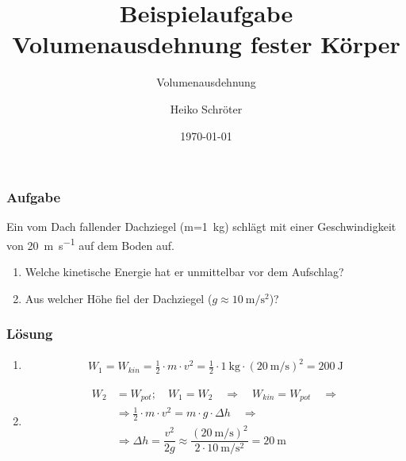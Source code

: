 \documentclass{beamer}
\title{Beispielaufgabe Volumenausdehnung fester Körper}
\subtitle{Volumenausdehnung}
\author{Heiko Schröter}
\date{\today}
\begin{document}

\frame
{
  \frametitle{Aufgabe}
Ein vom Dach fallender Dachziegel (m=\SI{1}{\kilo\gram}) schlägt mit einer Geschwindigkeit von \SI{20}{\meter\per\second} auf dem Boden auf.\\
\begin{enumerate}
\item Welche kinetische Energie hat er unmittelbar vor dem Aufschlag?
\item Aus welcher Höhe fiel der Dachziegel ($g\approx\SI{10}{\meter\per\square\second}$)?
\end{enumerate}
}
\frame
{
\frametitle{Lösung}
\begin{enumerate}
\item 
\begin{align*}
W_1=W_{kin}=\frac{1}{2}\cdot m\cdot v^{2}=\frac{1}{2}\cdot \SI{1}{\kilo\gram}\cdot \left( \SI{20}{\meter\per\second}\right)^{2}=\SI{200}{\joule}
\end{align*}
\item
\begin{align*}
W_2&=W_{pot};\quad W_1=W_2\quad\Rightarrow\quad W_{kin}=W_{pot}\quad\Rightarrow\\
&\Rightarrow \frac{1}{2}\cdot m\cdot v^{2}=m\cdot g\cdot \Delta h\quad \Rightarrow\\
&\Rightarrow \Delta h=\dfrac{v^{2}}{2g}\approx \dfrac{\left( \SI{20}{\meter\per\second}\right)^{2}}{2\cdot \SI{10}{\meter\per\square\second}}=\SI{20}{\meter}
\end{align*}
\end{enumerate}
}
\end{document}
